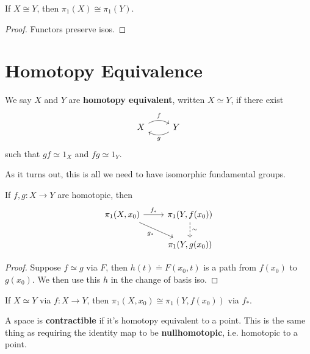 \documentclass[twoside,10pt]{report}
\begin{document}
\begin{prop}
	If $X \cong Y$, then $\pi_1(X)\cong \pi_1(Y)$.
\end{prop}
\begin{proof}
	Functors preserve isos.
\end{proof}

\section{Homotopy Equivalence}

\begin{defn}[]
We say $X$ and $Y$ are \textbf{homotopy equivalent}, written $X \simeq Y$, if there exist
\[
	\begin{tikzcd}
		X \rar[bend left]{f} & Y \lar[bend left]{g}
	\end{tikzcd}
\] such that $gf \simeq 1_{X}$ and $fg \simeq 1_{Y}$.
\end{defn}

As it turns out, this is all we need to have isomorphic fundamental groups.

\begin{thrm}[]
	If $f,g:X\to Y$ are homotopic, then
	\[
	\begin{tikzcd}
		\pi_1(X,x_0) \rar{f_{*}} \arrow[dr, "g_{*}"'] & \pi_1(Y,f(x_0)) \dar[dashed]{\sim} \\
		& \pi_1(Y,g(x_0))
	\end{tikzcd}
	\] 
\end{thrm}
\begin{proof}
	Suppose $f \simeq g$ via $F$, then $h(t) \doteq F(x_0,t)$ is a path from $f(x_0)$ to $g(x_0)$. We then use this $h$ in the change of basis iso. 
\end{proof}

\begin{cor}
	\label{htpy-equiv-iso-fundamental-grp}
	If $X \simeq Y$ via $f:X\to Y$, then $\pi_1(X,x_0) \cong \pi_1(Y,f(x_0))$ via $f_{*}$.
\end{cor}

\begin{defn}[]
A space is \textbf{contractible} if it's homotopy equivalent to a point. This is the same thing as requiring the identity map to be \textbf{nullhomotopic}, i.e. homotopic to a point.
\end{defn}
\end{document}
